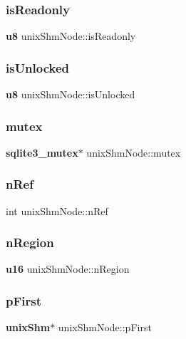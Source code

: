 \mbox{\label{structunix_shm_node_ad241b0a85f01110310cea91aa38fccb2}} 
\subsubsection{isReadonly}
{\footnotesize\ttfamily \textbf{ u8} unix\+Shm\+Node\+::is\+Readonly}

\mbox{\label{structunix_shm_node_acb9958faa435f9df066cd874e6b70083}} 
\subsubsection{isUnlocked}
{\footnotesize\ttfamily \textbf{ u8} unix\+Shm\+Node\+::is\+Unlocked}

\mbox{\label{structunix_shm_node_aa90850530f48fec6f2a872874f8ddf1f}} 
\subsubsection{mutex}
{\footnotesize\ttfamily \textbf{ sqlite3\+\_\+mutex}$\ast$ unix\+Shm\+Node\+::mutex}

\mbox{\label{structunix_shm_node_a6d9f0c9dec3f6710cb09c90723a8284b}} 
\subsubsection{nRef}
{\footnotesize\ttfamily int unix\+Shm\+Node\+::n\+Ref}

\mbox{\label{structunix_shm_node_aaf1fceb640b3959424403885c0419a46}} 
\subsubsection{nRegion}
{\footnotesize\ttfamily \textbf{ u16} unix\+Shm\+Node\+::n\+Region}

\mbox{\label{structunix_shm_node_a0ddd6c4625acf5994a60b0c368bc665e}} 
\subsubsection{pFirst}
{\footnotesize\ttfamily \textbf{ unix\+Shm}$\ast$ unix\+Shm\+Node\+::p\+First}

